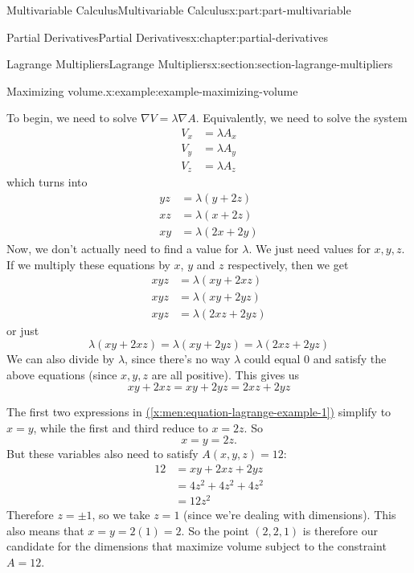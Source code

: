\documentclass[twoside,10pt,]{book}
\newcommand{\xreffont}{\relax}
\numberwithin{equation}{part}
\newcommand{\grad}{\nabla}
\begin{document}
\begin{partptx}{Multivariable Calculus}{}{Multivariable Calculus}{}{}{x:part:part-multivariable}
\begin{chapterptx}{Partial Derivatives}{}{Partial Derivatives}{}{}{x:chapter:partial-derivatives}
\begin{sectionptx}{Lagrange Multipliers}{}{Lagrange Multipliers}{}{}{x:section:section-lagrange-multipliers}
\begin{example}{Maximizing volume.}{x:example:example-maximizing-volume}
\par
To begin, we need to solve \(\grad V = \lambda \grad A\). Equivalently, we need to solve the system%
\begin{align*}
V_{x} & = \lambda A_{x} \\
V_{y} & = \lambda A_{y} \\
V_{z} & = \lambda A_{z} 
\end{align*}
which turns into%
\begin{align*}
yz & = \lambda(y + 2z) \\
xz & = \lambda(x + 2z) \\
xy & = \lambda(2x + 2y) 
\end{align*}
Now, we don't actually need to find a value for \(\lambda\). We just need values for \(x,y,z\). If we multiply these equations by \(x\), \(y\) and \(z\) respectively, then we get%
\begin{align*}
xyz & = \lambda(xy + 2xz) \\
xyz & = \lambda(xy + 2yz) \\
xyz & = \lambda(2xz + 2yz) 
\end{align*}
or just%
\begin{equation*}
\lambda(xy + 2xz) = \lambda(xy + 2yz) = \lambda(2xz + 2yz)
\end{equation*}
We can also divide by \(\lambda\), since there's no way \(\lambda\) could equal \(0\) and satisfy the above equations (since \(x,y,z\) are all positive). This gives us%
\begin{equation}
xy + 2xz = xy + 2yz = 2xz + 2yz\label{x:men:equation-lagrange-example-1}
\end{equation}
%
\par
The first two expressions in \hyperref[x:men:equation-lagrange-example-1]{({\xreffont\ref{x:men:equation-lagrange-example-1}})} simplify to \(x=y\), while the first and third reduce to \(x = 2z\). So%
\begin{equation*}
x = y = 2z\text{.}
\end{equation*}
But these variables also need to satisfy \(A(x,y,z) = 12\):%
\begin{align*}
12 & = xy + 2xz + 2yz \\
& = 4z^{2} + 4z^{2} + 4z^{2} \\
& = 12z^{2} 
\end{align*}
Therefore \(z = \pm1\), so we take \(z=1\) (since we're dealing with dimensions). This also means that \(x = y = 2(1) = 2\). So the point \((2,2,1)\) is therefore our candidate for the dimensions that maximize volume subject to the constraint \(A = 12\).%

\end{example}
\end{sectionptx}
\end{chapterptx}
\end{partptx}
\end{document}
